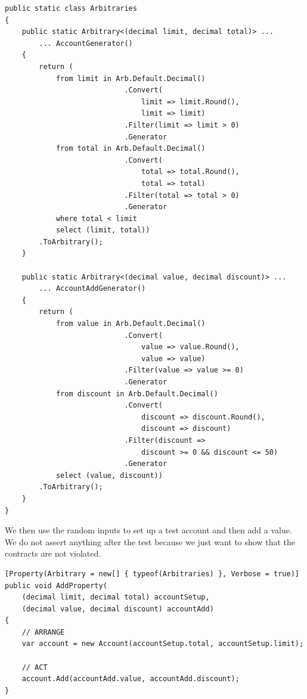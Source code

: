 \begin{lstlisting}[frame=single]
public static class Arbitraries
{
    public static Arbitrary<(decimal limit, decimal total)> ...
        ... AccountGenerator()
    {
        return (
            from limit in Arb.Default.Decimal()
                            .Convert(
                                limit => limit.Round(), 
                                limit => limit)
                            .Filter(limit => limit > 0)
                            .Generator
            from total in Arb.Default.Decimal()
                            .Convert(
                                total => total.Round(), 
                                total => total)
                            .Filter(total => total > 0)
                            .Generator
            where total < limit
            select (limit, total))
        .ToArbitrary();
    }

    public static Arbitrary<(decimal value, decimal discount)> ...
        ... AccountAddGenerator()
    {
        return (
            from value in Arb.Default.Decimal()
                            .Convert(
                                value => value.Round(),
                                value => value)
                            .Filter(value => value >= 0)
                            .Generator
            from discount in Arb.Default.Decimal()
                            .Convert(
                                discount => discount.Round(), 
                                discount => discount)
                            .Filter(discount => 
                                discount >= 0 && discount <= 50)
                            .Generator
            select (value, discount))
        .ToArbitrary();
    }
}
\end{lstlisting}

 We then use the random inputs to set up a test account and then add a value.
We do not assert anything after the test because we just want to show that the contracts are not 
violated. 

\vspace{5mm} %

\begin{lstlisting}[frame=single]
[Property(Arbitrary = new[] { typeof(Arbitraries) }, Verbose = true)]
public void AddProperty(
    (decimal limit, decimal total) accountSetup,
    (decimal value, decimal discount) accountAdd)
{
    // ARRANGE
    var account = new Account(accountSetup.total, accountSetup.limit);

    // ACT
    account.Add(accountAdd.value, accountAdd.discount);
}
\end{lstlisting}

